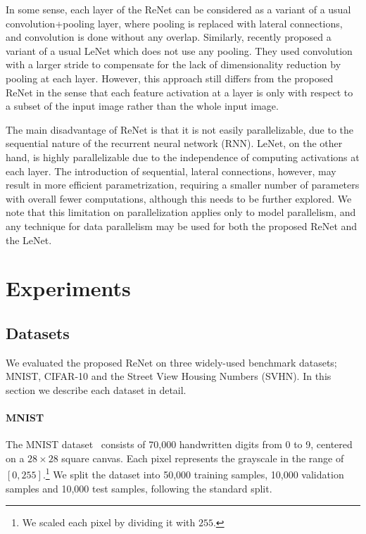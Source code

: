 In some sense, each layer of the ReNet can be considered as a variant of a usual
convolution+pooling layer, where pooling is replaced with lateral connections,
and convolution is done without any overlap. Similarly, \citet{Springenberg2014}
recently proposed a variant of a usual LeNet which does not use any pooling.
They used convolution with a larger stride to compensate for the lack of
dimensionality reduction by pooling at each layer. However, this approach still
differs from the proposed ReNet in the sense that each feature activation at a
layer is only with respect to a subset of the input image rather than the whole
input image.

The main disadvantage of ReNet is that it is not easily parallelizable, due to
the sequential nature of the recurrent neural network (RNN). LeNet, on the other
hand, is highly parallelizable due to the independence of computing activations
at each layer. The introduction of sequential, lateral connections, however, may
result in more efficient parametrization, requiring a smaller number of
parameters with overall fewer computations, although this needs to be further
explored. We note that this limitation on parallelization applies only to
model parallelism, and any technique for data parallelism may be used for both
the proposed ReNet and the LeNet.

\section{Experiments}

\subsection{Datasets}

We evaluated the proposed ReNet on three widely-used benchmark datasets; MNIST,
CIFAR-10 and the Street View Housing Numbers (SVHN). In this section we describe
each dataset in detail.

\paragraph{MNIST}
The MNIST dataset~\citep{Lecun99objectrecognition} consists of 70,000
handwritten digits from 0 to 9, centered on a $28\times 28$ square canvas. Each
pixel represents the grayscale in the range of $\left[0, 255\right]$.\footnote{
    We scaled each pixel by dividing it with $255$.
}
We split the dataset into 50,000 training samples, 10,000 validation
samples and 10,000 test samples, following the standard split.

